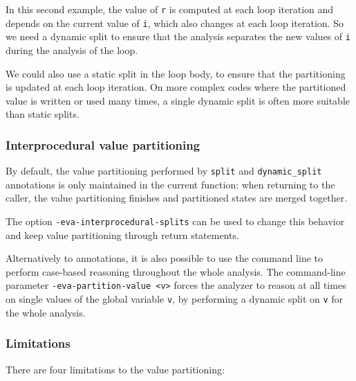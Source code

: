 \documentclass[web]{frama-c-book}
\begin{document}


In this second example, the value of \lstinline|r| is computed at each
loop iteration and depends on the current value of \lstinline|i|, which
also changes at each loop iteration.
So we need a dynamic split to ensure that the analysis separates the new
values of \lstinline|i| during the analysis of the loop.

We could also use a static split in the loop body, to ensure that the
partitioning is updated at each loop iteration. On more complex codes where
the partitioned value is written or used many times, a single dynamic split
is often more suitable than static splits.



\subsubsection{Interprocedural value partitioning}

By default, the value partitioning performed by \lstinline|split|
and \lstinline|dynamic_split| annotations is only maintained in the current
function: when returning to the caller, the value partitioning
finishes and partitioned states are merged together.

The option \lstinline|-eva-interprocedural-splits| can be used to change this
behavior and keep value partitioning through return statements.

Alternatively to annotations, it is also possible to use the command line to
perform case-based reasoning throughout the whole analysis. The command-line parameter
\lstinline|-eva-partition-value <v>| forces the analyzer to reason at all times
on single values of the global variable \lstinline|v|, by performing a
dynamic split on \lstinline|v| for the whole analysis.

\subsubsection{Limitations}

There are four limitations to the value partitioning:
\end{document}

